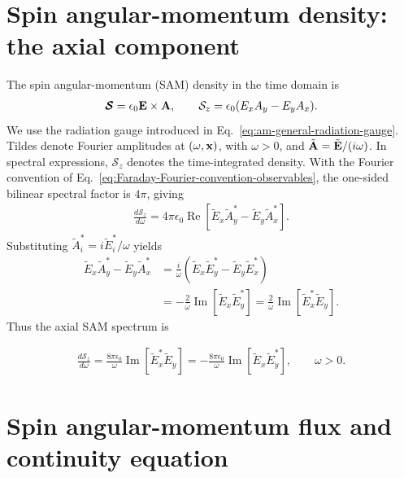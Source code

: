 
\section{Spin angular-momentum density: the axial component}
\label{sec:canonical-sam-density-and-flux}

The spin angular-momentum (SAM) density in the time domain is
\begin{align}
  \boldsymbol{\mathcal S}=\epsilon_0{\bf E}\times{\bf A},\qquad
  \mathcal S_z=\epsilon_0(E_x A_y-E_y A_x).
  \label{eq:canonical-sam-time-domain}
\end{align}
We use the radiation gauge introduced in
Eq.~\eqref{eq:am-general-radiation-gauge}.  Tildes denote Fourier amplitudes
at $(\omega,{\bf x})$, with $\omega>0$, and
$\tilde{\bf A}=\tilde{\bf E}/(i\omega)$.
In spectral expressions, $\mathcal S_z$ denotes the time-integrated density.
With the Fourier convention of
Eq.~\eqref{eq:Faraday-Fourier-convention-observables}, the one-sided
bilinear spectral factor is $4\pi$, giving
\begin{align}
  \frac{d\mathcal S_z}{d\omega}
  =4\pi\epsilon_0\operatorname{Re}\left[
    \tilde E_x\tilde A_y^*-\tilde E_y\tilde A_x^*
  \right].
  \label{eq:canonical-sam-bilinear-spectrum}
\end{align}
Substituting $\tilde A_i^*=i\tilde E_i^*/\omega$ yields
\begin{align}
  \tilde E_x\tilde A_y^*-\tilde E_y\tilde A_x^*
  &=\frac{i}{\omega}\left(
    \tilde E_x\tilde E_y^*-\tilde E_y\tilde E_x^*\right)\nonumber\\
  &=-\frac{2}{\omega}\operatorname{Im}
    \left[\tilde E_x\tilde E_y^*\right]
  =\frac{2}{\omega}\operatorname{Im}
    \left[\tilde E_x^*\tilde E_y\right].
  \label{eq:canonical-sam-spectral-reduction}
\end{align}
Thus the axial SAM spectrum is
\begin{importantbox}
  \begin{align}
    \frac{d\mathcal S_z}{d\omega}
    =\frac{8\pi\epsilon_0}{\omega}\operatorname{Im}
      \left[\tilde E_x^*\tilde E_y\right]
    =-\frac{8\pi\epsilon_0}{\omega}\operatorname{Im}
      \left[\tilde E_x\tilde E_y^*\right],\qquad \omega>0.
    \label{eq:canonical-sam-density-spectrum}
  \end{align}
\end{importantbox}

\section{Spin angular-momentum flux and continuity equation}
\label{sec:canonical-sam-flux}

